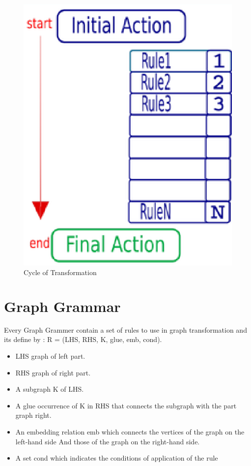 \begin{figure}[th]
	\centering
		\includegraphics[scale=0.8]{chapiter3/img/gt}
	\caption{\label{fig:Cycle of Tranformation}Cycle of Transformation}
\end{figure} 

 
\section{Graph Grammar} 
Every Graph Grammer contain a set of rules  to use in graph transformation
and its define by :
R = (LHS, RHS, K, glue, emb, cond). 
\begin{itemize}
 
\item LHS graph of left part.
\item RHS graph of right part.
\item A subgraph K of LHS.
\item A glue occurrence of K in RHS that connects the subgraph with the part graph  right.
\item An embedding relation emb which connects the vertices of the graph on the left-hand side
And those of the graph on the right-hand side.
\item A set cond which indicates the conditions of application of the rule
\end{itemize}

